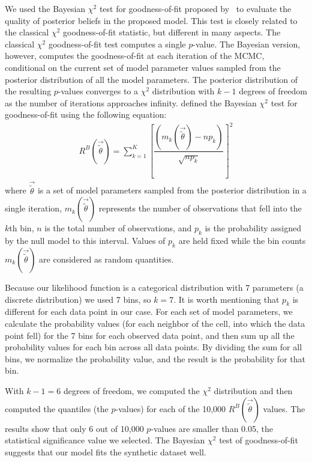 \documentclass[smallextended,natbib]{svjour3}
\begin{document}
We used the Bayesian $\chi^2$ test for goodness-of-fit proposed by~\cite{Chi-squaredTest} to evaluate the  quality of posterior beliefs in the proposed model. This test is closely related to the classical $\chi^2$ goodness-of-fit statistic, but different in many aspects. The classical $\chi^2$ goodness-of-fit test computes a single $p$-value. The Bayesian version, however, computes the goodness-of-fit at each iteration of the MCMC, conditional on the current set of model parameter values sampled from the posterior distribution of all the model parameters. The posterior distribution of the resulting $p$-values converges to a $\chi^2$ distribution with $k-1$ degrees of freedom as the number of iterations approaches infinity. \cite{Chi-squaredTest} defined the Bayesian $\chi^2$ test for goodness-of-fit using the following equation:
\begin{align}
R^B(\vec{\tilde{\theta}}) = \sum_{k=1}^K {\left [\dfrac{(m_k(\vec{\tilde{\theta}})-n p_k)}{\sqrt{n p_k}}\right ]}^2
\end{align}
where $\vec{\tilde{\theta}}$ is a set of model parameters sampled from the posterior distribution in a single iteration, $m_k(\vec{\tilde{\theta}})$ represents the number of observations that fell into the $k$th bin, $n$ is the total number of observations, and $p_k$ is the probability assigned by the null model to this interval. Values of $p_k$ are held fixed while the bin counts $m_k(\vec{\tilde{\theta}})$ are considered as random quantities.

Because our likelihood function is a categorical distribution with 7 parameters (a discrete distribution) we used 7 bins, so $k=7$. It is worth mentioning that $p_k$ is different for each data point in our case. For each set of model parameters, we calculate the probability values (for each neighbor of the cell, into which the data point fell) for the 7 bins for each observed data point, and then sum up all the probability values for each bin across all data points. By dividing the sum for all bins, we normalize the probability value, and the result is the probability for that bin.

With $k-1=6$ degrees of freedom, we computed the $\chi^2$ distribution and then computed the quantiles (the $p$-values) for each of the 10,000 $R^B(\vec{\tilde{\theta}})$ values. The results show that only 6 out of 10,000 $p$-values are smaller than 0.05, the statistical significance value we selected. The Bayesian $\chi^2$ test of goodness-of-fit suggests that our model fits the synthetic dataset well.
\end{document}
